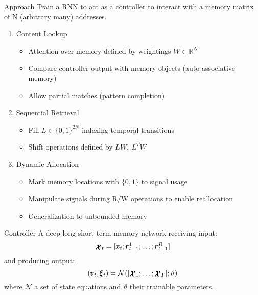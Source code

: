 \documentclass{beamer}
\newcommand{\xx}{\pmb{\raisebox{-1.5pt}{$\mathcal{X}$}}}
\begin{document}
\begin{frame}{Approach}
	Train a RNN to act as a \alert{controller} to interact with a memory matrix of N (arbitrary many) addresses.
	\pause
	\begin{enumerate}
	\item \alert{Content Lookup}\\
		\begin{itemize}
		\item \alert{Attention} over memory defined by weightings $W \in \mathbb{R}^N$
		\item Compare controller output with memory objects (\alert{auto-associative memory})
		\item Allow partial matches  (\alert{pattern completion})
		\end{itemize}
	\pause
	\item \alert{Sequential Retrieval}
		\begin{itemize} 
		\item Fill $L \in \{0,1\}^{2N}$ indexing \alert{temporal transitions}
		\item \alert{Shift} operations defined by $LW,\ L^TW$
		\end{itemize}
	\pause
	\item \alert{Dynamic Allocation}
		\begin{itemize}
		\item Mark memory locations with $\{0,1\}$ to \alert{signal usage}
		\item Manipulate signals during R/W operations to enable \alert{reallocation}
		\item Generalization to \alert{unbounded memory}
		\end{itemize}
	\end{enumerate}
\end{frame}
	
\begin{frame}{Controller}
	A deep \alert{long short-term memory network} receiving input:
	\[
	\xx_t=[ \pmb{x}_t; \pmb{r}_{t-1}^1; \dots ;\pmb{r}_{t-1}^R]
	\]
	and producing output:
	\[
	(\pmb{v}_t,\pmb{\xi}_t)=\mathcal{N}([\xx_1;\dots;\xx_T];\vartheta)
	\]
	where $\mathcal{N}$ a set of state equations and $\vartheta$ their trainable parameters.
\end{frame}
\end{document}
